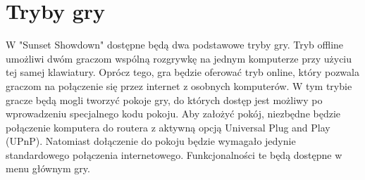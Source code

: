 \section{Tryby gry}
W "Sunset Showdown" dostępne będą dwa podstawowe tryby gry. Tryb offline umożliwi dwóm graczom wspólną rozgrywkę na jednym komputerze przy użyciu tej samej klawiatury. Oprócz tego, gra będzie oferować tryb online, który pozwala graczom na połączenie się przez internet z osobnych komputerów. W tym trybie gracze będą mogli tworzyć pokoje gry, do których dostęp jest możliwy po wprowadzeniu specjalnego kodu pokoju. Aby założyć pokój, niezbędne będzie połączenie komputera do routera z aktywną opcją Universal Plug and Play (UPnP). Natomiast dołączenie do pokoju będzie wymagało jedynie standardowego połączenia internetowego. Funkcjonalności te będą dostępne w menu głównym gry.